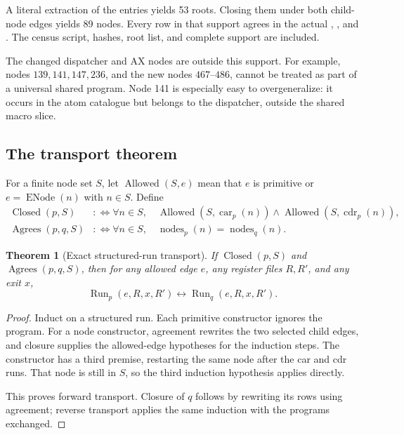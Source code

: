 \documentclass[11pt,letterpaper]{article}
\newcommand{\code}[1]{\texttt{\detokenize{#1}}}
\newcommand{\Run}{\operatorname{Run}}
\newtheorem{theorem}{Theorem}
\begin{document}
A literal extraction of the \code{sem (ENode n)} entries yields 53 roots.
Closing them under both child-node edges yields 89 nodes.
Every row in that support agrees in the actual
\code{dagPerm}, \code{dagDom}, and \code{dag219}.
The census script, hashes, root list, and complete support are included.\cite{macro215}

The changed dispatcher and AX nodes are outside this support.
For example, nodes \(139,141,147,236\), and the new nodes \(467\)--\(486\),
cannot be treated as part of a universal shared program.
Node 141 is especially easy to overgeneralize: it occurs in the atom
catalogue but belongs to the dispatcher, outside the shared macro slice.

\subsection{The transport theorem}

For a finite node set \(S\), let \(\operatorname{Allowed}(S,e)\) mean that
\(e\) is primitive or \(e=\operatorname{ENode}(n)\) with \(n\in S\).
Define
\[
\begin{split}
\operatorname{Closed}(p,S)
 &:\Longleftrightarrow
 \forall n\in S,\quad
 \operatorname{Allowed}(S,\operatorname{car}_p(n))
 \land \operatorname{Allowed}(S,\operatorname{cdr}_p(n)),\\
\operatorname{Agrees}(p,q,S)
 &:\Longleftrightarrow
 \forall n\in S,\quad
 \operatorname{nodes}_p(n)=\operatorname{nodes}_q(n).
\end{split}
\]

\begin{theorem}[Exact structured-run transport]
If \(\operatorname{Closed}(p,S)\) and
\(\operatorname{Agrees}(p,q,S)\), then for any allowed edge \(e\),
any register files \(R,R'\), and any exit \(x\),
\[
 \Run_p(e,R,x,R')\longleftrightarrow\Run_q(e,R,x,R').
\]
\end{theorem}

\begin{proof}
Induct on a structured run. Each primitive constructor ignores the program.
For a node constructor, agreement rewrites the two selected child edges,
and closure supplies the allowed-edge hypotheses for the induction steps.
The  constructor has a third premise, restarting
the same node after the car and cdr runs. That node is still in \(S\), so
the third induction hypothesis applies directly.

This proves forward transport. Closure of \(q\) follows by rewriting its
rows using agreement; reverse transport applies the same induction with
the programs exchanged.
\end{proof}
\end{document}
